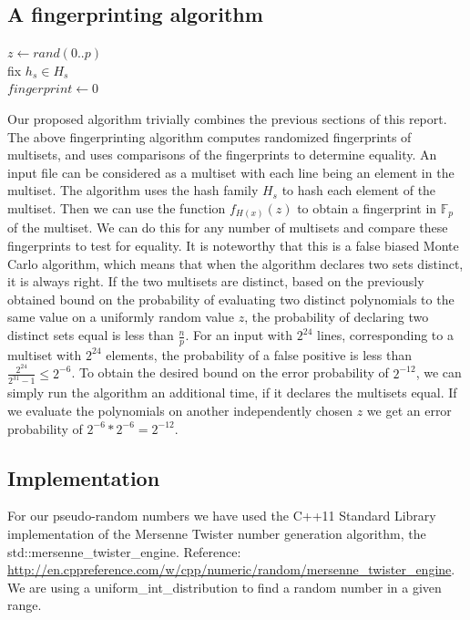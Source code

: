 \documentclass[article,a4paper,oneside]{article}
\newcommand{\+}[1]{\ensuremath{\boldsymbol{#1}}}
\begin{document}
\subsection*{A fingerprinting algorithm}
\begin{algorithm}[multisetfingerprinting]
	$z \gets rand(0..p)$\\
	fix $h_s \in H_s$\\
	$fingerprint \gets 0$\\

\end{algorithm}
Our proposed algorithm trivially combines the previous sections of this report.
	The above fingerprinting algorithm computes randomized fingerprints of multisets, and uses comparisons of the fingerprints to determine equality.
An input file can be considered as a multiset with each line being an element in the multiset.
The algorithm uses the hash family $H_s$ to hash each element of the multiset. Then we can use the function $f_{H(x)}(z)$ to obtain a fingerprint in $\mathbb{F}_p$ of the multiset.
We can do this for any number of multisets and compare these fingerprints to test for equality.
It is noteworthy that this is a false biased Monte Carlo algorithm, which means that when the algorithm declares two sets distinct, it is always right.
If the two multisets are distinct, based on the previously obtained bound on the probability of evaluating two distinct polynomials to the same value on a uniformly random value $z$, the probability of declaring two distinct sets equal is less than $\frac{n}{p}$.
For an input with $2^{24}$ lines, corresponding to a multiset with $2^{24}$ elements, the probability of a false positive is less than $\frac{2^{24}}{2^{31}-1} \leq 2^{-6}$. To obtain the desired bound on the error probability of $2^{-12}$, we can simply run the algorithm an additional time, if it declares the multisets equal. If we evaluate the polynomials on another independently chosen $z$ we get an error probability of $2^{-6}*2^{-6} = 2^{-12}$.

\subsection*{Implementation}

For our pseudo-random numbers we have used the C++11 Standard Library implementation of the Mersenne Twister number generation algorithm, the std::mersenne\_twister\_engine. Reference: \url{ http://en.cppreference.com/w/cpp/numeric/random/mersenne_twister_engine}. We are using a uniform\_int\_distribution to find a random number in a given range. 
\end{document}
